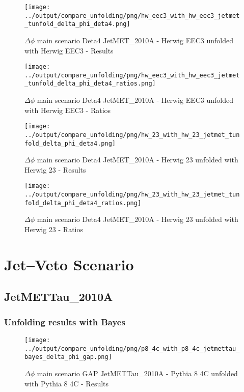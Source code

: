 \documentclass[11pt]{book}
\begin{document}
\begin{figure}[ht]
\centering
\texttt{[image: ../output/compare\_unfolding/png/hw\_eec3\_with\_hw\_eec3\_jetmet\_tunfold\_delta\_phi\_deta4.png]}
\caption{$\Delta\phi$ main scenario Deta4 JetMET\_2010A - Herwig EEC3 unfolded with Herwig EEC3 - Results}
\label{hw_eec3_hw_eec3_jetmet_tunfold_delta_phi_deta4_a}
\end{figure}

\begin{figure}[ht]
\centering
\texttt{[image: ../output/compare\_unfolding/png/hw\_eec3\_with\_hw\_eec3\_jetmet\_tunfold\_delta\_phi\_deta4\_ratios.png]}
\caption{$\Delta\phi$ main scenario Deta4 JetMET\_2010A - Herwig EEC3 unfolded with Herwig EEC3 - Ratios}
\label{hw_eec3_hw_eec3_jetmet_tunfold_delta_phi_deta4_b}
\end{figure}

\begin{figure}[ht]
\centering
\texttt{[image: ../output/compare\_unfolding/png/hw\_23\_with\_hw\_23\_jetmet\_tunfold\_delta\_phi\_deta4.png]}
\caption{$\Delta\phi$ main scenario Deta4 JetMET\_2010A - Herwig 23 unfolded with Herwig 23 - Results}
\label{hw_23_hw_23_jetmet_tunfold_delta_phi_deta4_a}
\end{figure}

\begin{figure}[ht]
\centering
\texttt{[image: ../output/compare\_unfolding/png/hw\_23\_with\_hw\_23\_jetmet\_tunfold\_delta\_phi\_deta4\_ratios.png]}
\caption{$\Delta\phi$ main scenario Deta4 JetMET\_2010A - Herwig 23 unfolded with Herwig 23 - Ratios}
\label{hw_23_hw_23_jetmet_tunfold_delta_phi_deta4_b}
\end{figure}



\cleardoublepage
\chapter{Jet--Veto Scenario}
\section{JetMETTau\_2010A}
\subsection{Unfolding results with Bayes}

\begin{figure}[ht]
\centering
\texttt{[image: ../output/compare\_unfolding/png/p8\_4c\_with\_p8\_4c\_jetmettau\_bayes\_delta\_phi\_gap.png]}
\caption{$\Delta\phi$ main scenario GAP JetMETTau\_2010A - Pythia 8 4C unfolded with Pythia 8 4C - Results}
\label{p8_p8_jetmettau_bayes_delta_phi_gap_a}
\end{figure}
\end{document}

